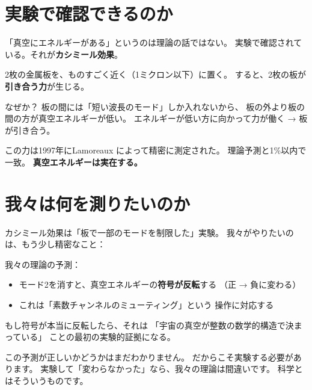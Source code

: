 \documentclass[12pt,a4paper]{article}
\begin{document}
\section{実験で確認できるのか}

「真空にエネルギーがある」というのは理論の話ではない。
実験で確認されている。それが\textbf{カシミール効果}。

\begin{naruhodox}[カシミール効果]
2枚の金属板を、ものすごく近く（1ミクロン以下）に置く。
すると、2枚の板が\textbf{引き合う力}が生じる。

なぜか？ 板の間には「短い波長のモード」しか入れないから、
板の外より板の間の方が真空エネルギーが低い。
エネルギーが低い方に向かって力が働く
→ 板が引き合う。

この力は1997年にLamoreaux によって精密に測定された。
理論予測と1\%以内で一致。
\textbf{真空エネルギーは実在する。}
\end{naruhodox}

\section{我々は何を測りたいのか}

カシミール効果は「板で一部のモードを制限した」実験。
我々がやりたいのは、もう少し精密なこと：

\begin{center}
\end{center}

我々の理論の予測：
\begin{itemize}
\item モード2を消すと、真空エネルギーの\textbf{符号が反転}する
（正 → 負に変わる）
\item これは「素数チャンネルのミューティング」という
操作に対応する
\end{itemize}

もし符号が本当に反転したら、それは
「宇宙の真空が整数の数学的構造で決まっている」
ことの最初の実験的証拠になる。

\begin{honestbox}[正直に]
この予測が正しいかどうかはまだわかりません。
だからこそ実験する必要があります。
実験して「変わらなかった」なら、我々の理論は間違いです。
科学とはそういうものです。
\end{honestbox}
\end{document}
